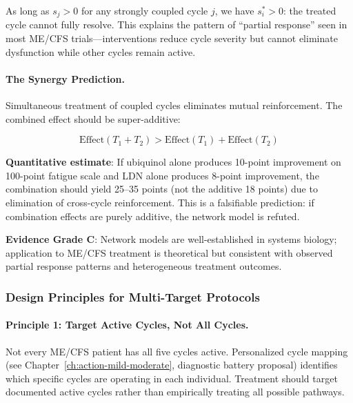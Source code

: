 As long as $s_j > 0$ for any strongly coupled cycle $j$, we have $s_i^* > 0$: the treated cycle cannot fully resolve. This explains the pattern of ``partial response'' seen in most ME/CFS trials---interventions reduce cycle severity but cannot eliminate dysfunction while other cycles remain active.

\paragraph{The Synergy Prediction.}

Simultaneous treatment of coupled cycles eliminates mutual reinforcement. The combined effect should be super-additive:

\begin{equation}
\text{Effect}(T_1 + T_2) > \text{Effect}(T_1) + \text{Effect}(T_2)
\label{eq:synergy-prediction}
\end{equation}

\textbf{Quantitative estimate}: If ubiquinol alone produces 10-point improvement on 100-point fatigue scale and LDN alone produces 8-point improvement, the combination should yield 25--35 points (not the additive 18 points) due to elimination of cross-cycle reinforcement. This is a falsifiable prediction: if combination effects are purely additive, the network model is refuted.

\textbf{Evidence Grade C}: Network models are well-established in systems biology; application to ME/CFS treatment is theoretical but consistent with observed partial response patterns and heterogeneous treatment outcomes.



\subsubsection{Design Principles for Multi-Target Protocols}

\paragraph{Principle 1: Target Active Cycles, Not All Cycles.}

Not every ME/CFS patient has all five cycles active. Personalized cycle mapping (see Chapter~\ref{ch:action-mild-moderate}, diagnostic battery proposal) identifies which specific cycles are operating in each individual. Treatment should target documented active cycles rather than empirically treating all possible pathways.

